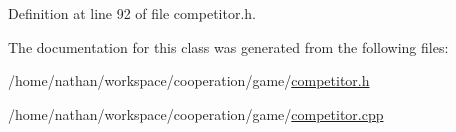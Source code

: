 Definition at line 92 of file competitor.h.



The documentation for this class was generated from the following files:\begin{DoxyCompactItemize}
\item 
/home/nathan/workspace/cooperation/game/\hyperlink{competitor_8h}{competitor.h}\item 
/home/nathan/workspace/cooperation/game/\hyperlink{competitor_8cpp}{competitor.cpp}\end{DoxyCompactItemize}
